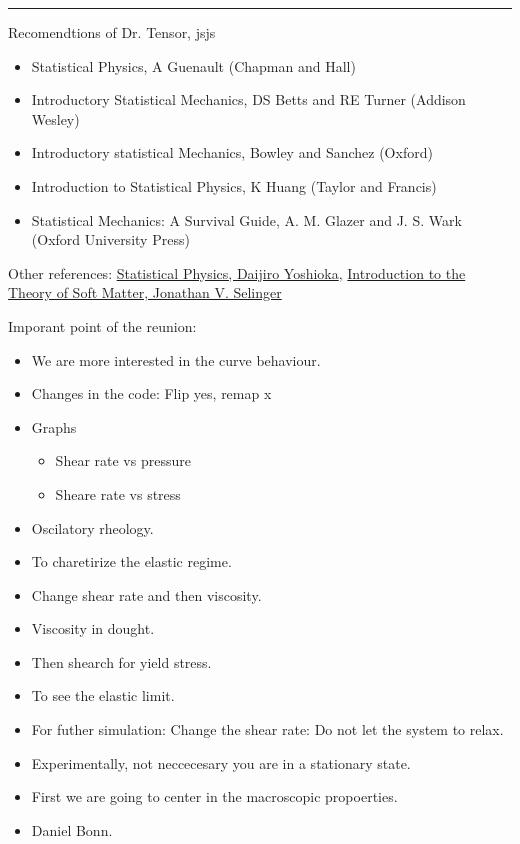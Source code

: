 \documentclass[a4paper, 11pt, oneside]{researchjournal} %
\begin{document}
\rule{\textwidth}{0.4pt}

Recomendtions of Dr. Tensor, jsjs

\begin{itemize}
	\item Statistical Physics, A Guenault (Chapman and Hall)
	\item Introductory Statistical Mechanics, DS Betts and RE Turner (Addison Wesley)
	\item Introductory statistical Mechanics, Bowley and Sanchez (Oxford)
	\item Introduction to Statistical Physics, K Huang (Taylor and Francis)
	\item Statistical Mechanics: A Survival Guide, A. M. Glazer and J. S. Wark (Oxford University Press)
\end{itemize}

Other references: 
\href{https://link.springer.com/book/10.1007/978-3-540-28606-6}{Statistical Physics, Daijiro Yoshioka}, 
\href{https://link.springer.com/book/10.1007/978-3-319-21054-4}{Introduction to the Theory of Soft Matter, Jonathan V. Selinger}


Imporant point of the reunion:
\begin{itemize}
	\item We are more interested in the curve behaviour.
	\item Changes in the code: Flip yes, remap x
	\item Graphs
	\begin{itemize}
		\item Shear rate vs pressure
		\item Sheare rate vs stress
	\end{itemize}
	\item Oscilatory rheology.
	\item To charetirize the elastic regime.
	\item Change shear rate and then viscosity.
	\item Viscosity in dought.
	\item Then shearch for yield stress.
	\item To see the elastic limit.
	\item For futher simulation: Change the shear rate: Do not let the system to relax.
	\item Experimentally, not neccecesary you are in a stationary state.
	\item First we are going to center in the macroscopic propoerties.
	\item Daniel Bonn.
\end{itemize}


\end{document}
